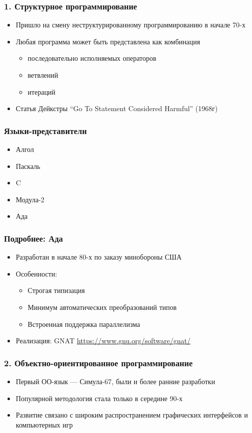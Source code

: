 \documentclass[xetex,mathserif,serif]{beamer}
\begin{document}
	\begin{frame}
		\frametitle{1. Структурное программирование}
		\begin{itemize}
			\item Пришло на смену неструктурированному программированию в начале 70-х
			\item Любая программа может быть представлена как комбинация
			\begin{itemize}
				\item последовательно исполняемых операторов
				\item ветвлений
				\item итераций
			\end{itemize}
			\item Статья Дейкстры ``Go To Statement Considered Harmful'' (1968г)
		\end{itemize}
	\end{frame}

	\begin{frame}
		\frametitle{Языки-представители}
		\begin{itemize}
			\item Алгол
			\item Паскаль
			\item C
			\item Модула-2
			\item Ада
		\end{itemize}
	\end{frame}

	\begin{frame}
		\frametitle{Подробнее: Ада}
		\begin{itemize}
			\item Разработан в начале 80-х по заказу минобороны США
			\item Особенности:
			\begin{itemize}
				\item Строгая типизация
				\item Минимум автоматических преобразований типов
				\item Встроенная поддержка параллелизма
			\end{itemize}
			\item Реализация: GNAT \url{https://www.gnu.org/software/gnat/}
		\end{itemize}
	\end{frame}

	\begin{frame}
		\frametitle{2. Объектно-ориентированное программирование}
		\begin{itemize}
			\item Первый ОО-язык --- Симула-67, были и более ранние разработки
			\item Популярной методология стала только в середине 90-х
			\item Развитие связано с широким распространением графических интерфейсов и компьютерных игр
		\end{itemize}
	\end{frame}
\end{document}
